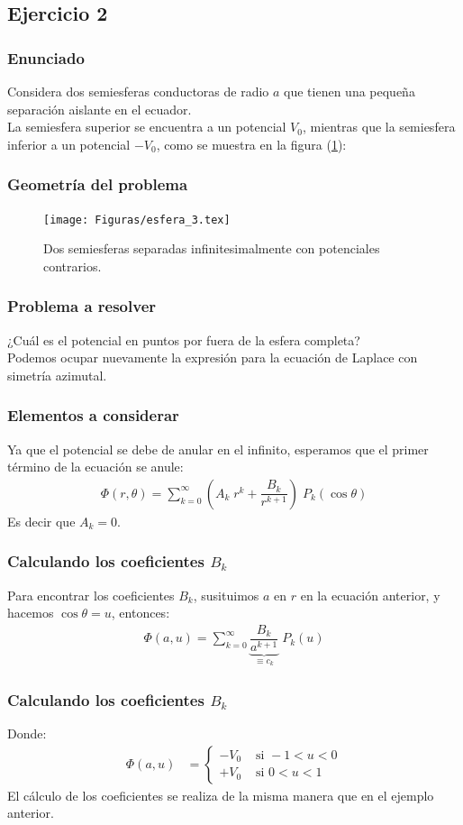 \subsection{Ejercicio 2}
\begin{frame}
\frametitle{Enunciado}
Considera dos semiesferas conductoras de radio $a$ que tienen una pequeña separación aislante en el ecuador.
\\
\bigskip
\pause
La semiesfera superior se encuentra a un potencial $V_{0}$, mientras que la semiesfera inferior a un potencial $-V_{0}$, como se muestra en la figura (\ref{fig:figura_03}):
\end{frame}
\begin{frame}
\frametitle{Geometría del problema}
\begin{figure}
    \centering
    \texttt{[image: Figuras/esfera\_3.tex]}
    \caption{Dos semiesferas separadas infinitesimalmente con potenciales contrarios.}
\label{fig:figura_03}
\end{figure}
\end{frame}
\begin{frame}
\frametitle{Problema a resolver}
¿Cuál es el potencial en puntos por fuera de la esfera completa?
\\
\bigskip
\pause
Podemos ocupar nuevamente la expresión para la ecuación de Laplace con simetría azimutal.
\end{frame}
\begin{frame}
\frametitle{Elementos a considerar}
Ya que el potencial se debe de anular en el infinito, esperamos que el primer término de la ecuación se anule:
\begin{align*}
\Phi (r, \theta) = \sum_{k=0}^{\infty} \left( A_{k} \; r^{k} + \dfrac{B_{k}}{r^{k+1}} \right) \; P_{k} (\cos \theta)
\end{align*}
\pause
Es decir que $A_{k} = 0$.
\end{frame}
\begin{frame}
\frametitle{Calculando los coeficientes $B_{k}$}
Para encontrar los coeficientes $B_{k}$, \pause susituimos $a$ en $r$ en la ecuación anterior, y hacemos $\cos \theta = u$, entonces:
\begin{align*}
\Phi (a, u) = \sum_{k=0}^{\infty} \dfrac{B_{k}}{\underbrace{a^{k+1}}_{\equiv c_{k}}} \; P_{k} (u)
\end{align*}
\end{frame}
\begin{frame}
\frametitle{Calculando los coeficientes $B_{k}$}
Donde:
\begin{align*}
\Phi(a, u) &= \begin{cases}
-V_{0} & \mbox{ si } -1 < u < 0 \\[0.5em]
+V_{0} & \mbox{ si } 0 < u < 1
\end{cases}
\end{align*}
\pause
El cálculo de los coeficientes se realiza de la misma manera que en el ejemplo anterior.
\end{frame}
